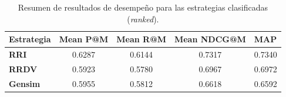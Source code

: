 \begin{table}[H]
\centering
\begin{tabular}{|l|c|c|c|c|}
\hline
\textbf{Estrategia} & \multicolumn{1}{l|}{\textbf{Mean P@M}} & \multicolumn{1}{l|}{\textbf{Mean R@M}} & \multicolumn{1}{l|}{\textbf{Mean NDCG@M}} & \multicolumn{1}{l|}{\textbf{MAP}} \\ \hline
\textbf{RRI} & 0.6287 & 0.6144 & 0.7317 & 0.7340 \\ \hline
\textbf{RRDV} & 0.5923 & 0.5780 & 0.6967 & 0.6972 \\ \hline
\textbf{Gensim} & 0.5955 & 0.5812 & 0.6618 & 0.6592 \\ \hline
\end{tabular}
\caption{Resumen de resultados de desempeño para las estrategias clasificadas (\textit{ranked}).}
\label{tab:rankedResults}
\end{table}

